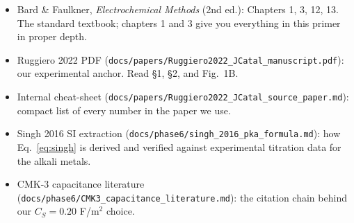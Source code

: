 \documentclass[11pt]{article}
\begin{document}
\begin{itemize}[leftmargin=*]
\item Bard \& Faulkner, \textit{Electrochemical Methods} (2nd ed.):
      Chapters 1, 3, 12, 13. The standard textbook; chapters 1 and 3
      give you everything in this primer in proper depth.
\item Ruggiero 2022 PDF
      (\texttt{docs/papers/Ruggiero2022\_JCatal\_manuscript.pdf}):
      our experimental anchor. Read \S 1, \S 2, and Fig.\ 1B.
\item Internal cheat-sheet
      (\texttt{docs/papers/Ruggiero2022\_JCatal\_source\_paper.md}):
      compact list of every number in the paper we use.
\item Singh 2016 SI extraction
      (\texttt{docs/phase6/singh\_2016\_pka\_formula.md}): how
      Eq.~\ref{eq:singh} is derived and verified against
      experimental titration data for the alkali metals.
\item CMK-3 capacitance literature
      (\texttt{docs/phase6/CMK3\_capacitance\_literature.md}): the
      citation chain behind our $C_S = 0.20$ F/m$^2$ choice.
\end{itemize}

\onboardingfooter
\end{document}
